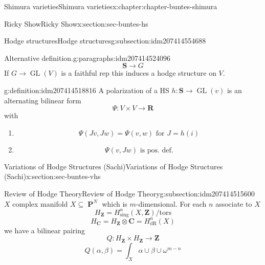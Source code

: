\documentclass[oneside,10pt,]{book}
\numberwithin{equation}{section}
\newcommand{\ZZ}{\mathbf{Z}}
\newcommand{\RR}{\mathbf{R}}
\newcommand{\CC}{\mathbf{C}}
\newcommand{\dR}{\mathrm{dR}}
\newcommand{\tors}{\mathrm{tors}}
\DeclareMathOperator{\PP}{\mathbf{P}}
\DeclareMathOperator{\GL}{GL}
\begin{document}
\begin{chapterptx}{Shimura varieties}{}{Shimura varieties}{}{}{x:chapter:chapter-buntes-shimura}
\begin{sectionptx}{Ricky Show}{}{Ricky Show}{}{}{x:section:sec-buntes-hs}
\begin{subsectionptx}{Hodge structures}{}{Hodge structures}{}{}{g:subsection:idm207414554688}
\begin{paragraphs}{Alternative definition.}{g:paragraphs:idm207414524096}
\begin{equation*}
\mathbf S \to G
\end{equation*}
If \(G \to \GL(V)\) is a faithful rep this induces a hodge structure on \(V\).%
\begin{definition}{}{g:definition:idm207414518816}%
A polarization of a HS \(h\colon \mathbf S \to \GL(v)\) is an alternating bilinear form%
\begin{equation*}
\Psi \colon V\times V \to \RR
\end{equation*}
with%
\begin{enumerate}
\item{}%
\begin{equation*}
\Psi (Jv,Jw) =  \Psi(v,w) \text{ for } J = h(i)
\end{equation*}
%
\item{}%
\begin{equation*}
\Psi(v,Jw) \text{ is pos. def.}
\end{equation*}
%
\end{enumerate}
%
\end{definition}
\end{paragraphs}%
\end{subsectionptx}
\end{sectionptx}
%
%
\typeout{************************************************}
\typeout{************************************************}
%
\begin{sectionptx}{Variations of Hodge Structures (Sachi)}{}{Variations of Hodge Structures (Sachi)}{}{}{x:section:sec-buntes-vhs}
%
%
\typeout{************************************************}
\typeout{************************************************}
%
\begin{subsectionptx}{Review of Hodge Theory}{}{Review of Hodge Theory}{}{}{g:subsection:idm207414515600}
\(X\) complex manifold \(X\subseteq \PP^N\) which is \(m\)-dimensional. For each \(n\) associate to \(X\)%
\begin{equation*}
H_\ZZ = H^n_{\mathrm{sing}}(X, \ZZ) / \tors
\end{equation*}
%
\begin{equation*}
H_\CC = H_\ZZ \otimes \CC = H^n_\dR(X)
\end{equation*}
we have a bilinear pairing%
\begin{equation*}
Q\colon H_\ZZ \times H_\ZZ \to \ZZ
\end{equation*}
%
\begin{equation*}
Q(\alpha,\beta) = \int_X \alpha \cup \beta \cup \omega^{m-n}

\end{equation*}
\end{subsectionptx}
\end{sectionptx}
\end{chapterptx}
\end{document}
